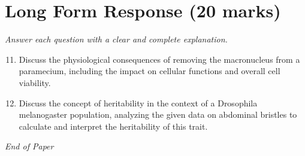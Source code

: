 \documentclass[12pt]{article}
\begin{document}
\section*{Long Form Response (20 marks)}
\textit{Answer each question with a clear and complete explanation.}
\begin{enumerate}[label=\arabic*.]
\setcounter{enumi}{10}
\item Discuss the physiological consequences of removing the macronucleus from a paramecium, including the impact on cellular functions and overall cell viability.
\item Discuss the concept of heritability in the context of a Drosophila melanogaster population, analyzing the given data on abdominal bristles to calculate and interpret the heritability of this trait.
\end{enumerate}

\vfill
\noindent\textit{End of Paper}
\end{document}
